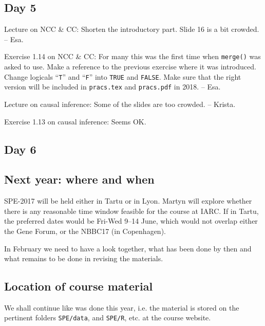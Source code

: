 \subsection*{Day 5}

Lecture on NCC \& CC: Shorten the introductory part. Slide 16 is a bit crowded. -- Esa. 

Exercise 1.14 on NCC \& CC: 
For many this was the first time when {\tt merge()} was asked to use. Make a reference to the previous exercise
where it was introduced.
Change logicals ``{\tt T}'' and ``{\tt F}'' into
{\tt TRUE} and {\tt FALSE}. 
Make sure that the right version will be included in {\tt pracs.tex} and {\tt pracs.pdf} in 2018. -- Esa.

Lecture on causal inference: Some of the slides are too crowded. -- Krista.

Exercise 1.13 on causal inference: Seems OK.

\subsection*{Day 6}



\subsection*{Next year: where and when}
SPE-2017 will be held either in Tartu or in Lyon. Martyn will explore whether there is any 
reasonable time window feasible for the course at IARC.
If in Tartu, the preferred dates would be Fri-Wed 9--14 June, 
which would not overlap either the Gene Forum, or the NBBC17 (in Copenhagen).

In February we need to have a look together, what has been done  by then
and what remains to be done in revising the materials.

\subsection*{Location of course material}
We shall continue like was done this year, i.e. the material is stored on the pertinent folders 
\texttt{SPE/data}, and \texttt{SPE/R}, etc. at the course website.

